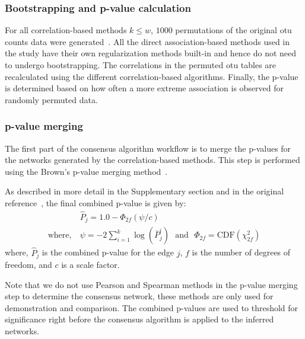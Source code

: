  \subsubsection*{Bootstrapping and p-value calculation}
  \vspace{-5mm}
  For all correlation-based methods $k \le w$, $1000$ permutations of the original \ac{otu} counts data were generated~\cite{Watts2018}.
  All the direct association-based methods used in the study have their own regularization methods built-in and hence do not need to undergo bootstrapping.
  The correlations in the permuted \ac{otu} tables are recalculated using the different correlation-based algorithms.
  Finally, the p-value is determined based on how often a more extreme association is observed for randomly permuted data.

  \subsubsection*{p-value merging}
  \vspace{-5mm}
  The first part of the consensus algorithm workflow is to merge the p-values for the networks generated by the correlation-based methods.
  This step is performed using the Brown's p-value merging method~\cite{Poole_Gibbs_Shmulevich_Bernard_Knijnenburg_2016,faustCoNetAppInference2016}.

  As described in more detail in the Supplementary section and in the original reference~\cite{Poole_Gibbs_Shmulevich_Bernard_Knijnenburg_2016}, the final combined p-value is given by:
  \begin{equation}
    \begin{aligned}
        & \hat{P}_j = 1.0 - \Phi_{2f}\left( \psi / c \right) \\
        \text{where},~ &\psi = -2 \sum_{i=1}^k \log(\bar{P}^i_j) ~~~\text{and}~~~ \Phi_{2f} = \mathrm{CDF}\left( \chi^2_{2f} \right)
    \end{aligned}
    \label{eqn:pvalue-combined}
  \end{equation}
  where, $\hat{P}_j$ is the combined p-value for the edge $j$, $f$ is the number of degrees of freedom, and $c$ is a scale factor.

  Note that we do not use Pearson and Spearman methods in the p-value merging step to determine the consensus network, these methods are only used for demonstration and comparison.
  The combined p-values are used to threshold for significance right before the consensus algorithm is applied to the inferred networks.


